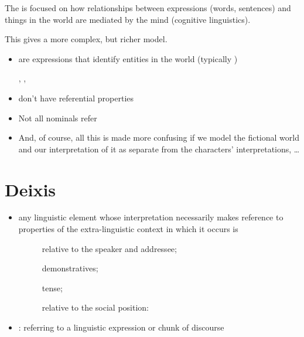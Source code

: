 \documentclass[a4paper,landscape,headrule,footrule,xetex,25pt]{foils}
\begin{document}
 The  is focused on how relationships between
 expressions (words, sentences) and things in the world are mediated by
 the mind (cognitive linguistics).  

This gives a more complex, but richer model.



\begin{itemize}
\item {} are expressions that identify
  entities in the world (typically )
  \begin{exe}
    \ex {}, 
    \ex {}, 
  \end{exe}
\item {} don't have referential properties
  \begin{exe}
    \ex {}
  \end{exe}
\item Not all nominals refer
  \begin{exe}
    \ex {}
    \ex {}
  \end{exe}
\item And, of course, all this is made more confusing if we model the
  fictional world and our interpretation of it as separate from the
  characters' interpretations, \ldots
\end{itemize}


\section{Deixis}

\begin{itemize}
\item any linguistic element whose interpretation
  necessarily makes reference to properties of the
  extra-linguistic context in which it occurs is 
  \begin{description}
  \item[] relative to the speaker and addressee; 
  \item[] demonstratives; 
  \item[] tense; 
  \item[] relative to the social position: 
  \end{description}
\item {}: referring to a linguistic expression or chunk of discourse
\end{itemize}
\end{document}
